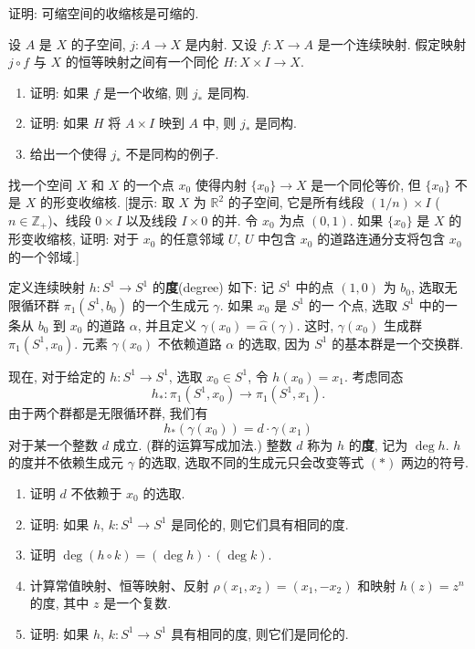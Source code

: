 \begin{exercise}
证明: 可缩空间的收缩核是可缩的.
\end{exercise}

\begin{exercise}
设 $A$ 是 $X$ 的子空间, $j\colon A\to X$ 是内射. 又设 $f\colon X\to A$ 是一个连续映射. 假定映射 $j\circ f$ 与 $X$ 的恒等映射之间有一个同伦 $H\colon X\times I\to X$.
\begin{enumerate}
\item 证明: 如果 $f$ 是一个收缩, 则 $j_*$ 是同构.
\item 证明: 如果 $H$ 将 $A\times I$ 映到 $A$ 中, 则 $j_*$ 是同构.
\item 给出一个使得 $j_*$ 不是同构的例子.
\end{enumerate}
\end{exercise}

\begin{exercise}
找一个空间 $X$ 和 $X$ 的一个点 $x_0$ 使得内射 $\{x_0\}\to X$ 是一个同伦等价, 但 $\{x_0\}$ 不是 $X$ 的形变收缩核. [提示: 取 $X$ 为 $\mathbb{R}^{2}$ 的子空间, 它是所有线段 $(1/n)\times I$ ($n\in\mathbb{Z}_{+}$)、线段 $0\times I$ 以及线段 $I\times 0$ 的并. 令 $x_0$ 为点 $(0,1)$. 如果 $\{x_0\}$ 是 $X$ 的形变收缩核, 证明: 对于 $x_0$ 的任意邻域 $U$, $U$ 中包含 $x_0$ 的道路连通分支将包含 $x_0$ 的一个邻域.]
\end{exercise}

\begin{exercise}
定义连续映射 $h\colon S^{1}\to S^{1}$ 的\textbf{度}(degree) 如下:
记 $S^{1}$ 中的点 $(1,0)$ 为 $b_0$, 选取无限循环群 $\pi_1(S^{1},b_0)$ 的一个生成元 $\gamma$. 如果 $x_0$ 是 $S^{1}$ 的一
个点, 选取 $S^{1}$ 中的一条从 $b_0$ 到 $x_0$ 的道路 $\alpha$, 并且定义 $\gamma(x_0)=\hat{\alpha}(\gamma)$. 这时, $\gamma(x_0)$ 生成群 $\pi_1(S^{1},x_0)$. 元素 $\gamma(x_0)$ 不依赖道路 $\alpha$ 的选取, 因为 $S^{1}$ 的基本群是一个交换群.

现在, 对于给定的 $h\colon S^{1}\to S^{1}$, 选取 $x_0\in S^{1}$, 令 $h(x_0)=x_1$. 考虑同态
\[
h_{*}\colon\pi_{1}(S^{1},x_{0})\longrightarrow\pi_{1}(S^{1},x_{1}).
\]
由于两个群都是无限循环群, 我们有
\[
h_{*}(\gamma(x_{0}))=d\cdot\gamma(x_{1})\tag{$*$}
\]
对于某一个整数 $d$ 成立. (群的运算写成加法.) 整数 $d$ 称为 $h$ 的\textbf{度}, 记为 $\deg h$. $h$ 的度并不依赖生成元 $\gamma$ 的选取, 选取不同的生成元只会改变等式 $(*)$ 两边的符号.
\begin{enumerate}
\item 证明 $d$ 不依赖于 $x_0$ 的选取.
\item 证明: 如果 $h$, $k\colon S^{1}\to S^{1}$ 是同伦的, 则它们具有相同的度.
\item 证明 $\deg(h\circ k)=(\deg h)\cdot(\deg k)$.
\item 计算常值映射、恒等映射、反射 $\rho(x_1,x_2)=(x_1,-x_2)$ 和映射 $h(z)=z^n$ 的度, 其中 $z$ 是一个复数.
\item 证明: 如果 $h$, $k\colon S^{1}\to S^{1}$ 具有相同的度, 则它们是同伦的.
\end{enumerate}
\end{exercise}

